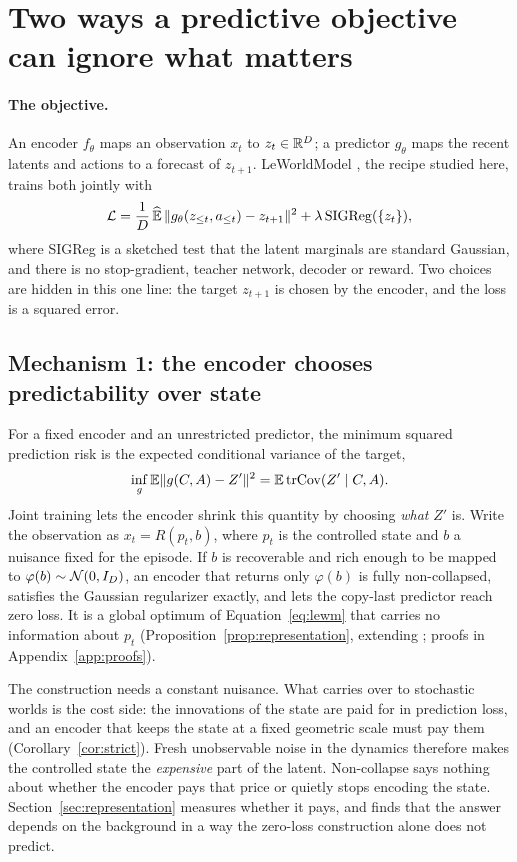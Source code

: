 \section{Two ways a predictive objective can ignore what matters}
\label{sec:mechanisms}

\paragraph{The objective.}
An encoder $f_\theta$ maps an observation $x_t$ to $z_t\in\mathbb{R}^D$; a predictor $g_\theta$ maps the
recent latents and actions to a forecast of $z_{t+1}$. LeWorldModel \citep{maes2026lewm}, the
recipe studied here, trains both jointly with
\begin{equation}
\label{eq:lewm}
\mathcal{L}=\frac1D\,\widehat{\mathbb{E}}\,\|g_\theta(z_{\le t},a_{\le t})-z_{t+1}\|^2
+\lambda\,\mathrm{SIGReg}(\{z_t\}),
\end{equation}
where SIGReg is a sketched test that the latent marginals are standard Gaussian, and there is no
stop-gradient, teacher network, decoder or reward. Two choices are hidden in this one line: the
target $z_{t+1}$ is chosen by the encoder, and the loss is a squared error.

\subsection{Mechanism 1: the encoder chooses predictability over state}
\label{sec:nuisance-example}

For a fixed encoder and an unrestricted predictor, the minimum squared prediction risk is the
expected conditional variance of the target,
\[
\inf_g\mathbb{E}\|g(C,A)-Z'\|^2=\mathbb{E}\,\mathrm{tr}\mathrm{Cov}(Z'\mid C,A).
\]
Joint training lets the encoder shrink this quantity by choosing \emph{what} $Z'$ is. Write the
observation as $x_t=R(p_t,b)$, where $p_t$ is the controlled state and $b$ a nuisance fixed for the
episode. If $b$ is recoverable and rich enough to be mapped to $\varphi(b)\sim\mathcal{N}(0,I_D)$, an
encoder that returns only $\varphi(b)$ is fully non-collapsed, satisfies the Gaussian regularizer
exactly, and lets the copy-last predictor reach zero loss. It is a global optimum of
Equation~\ref{eq:lewm} that carries no information about $p_t$
(Proposition~\ref{prop:representation}, extending \citealp{sobal2022slow}; proofs in
Appendix~\ref{app:proofs}).

The construction needs a constant nuisance. What carries over to stochastic worlds is the cost
side: the innovations of the state are paid for in prediction loss, and an encoder that keeps the
state at a fixed geometric scale must pay them (Corollary~\ref{cor:strict}). Fresh unobservable
noise in the dynamics therefore makes the controlled state the \emph{expensive} part of the
latent. Non-collapse says nothing about whether the encoder pays that price or quietly stops
encoding the state. Section~\ref{sec:representation} measures whether it pays, and finds that the
answer depends on the background in a way the zero-loss construction alone does not predict.

